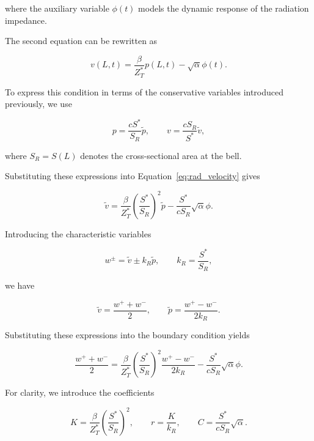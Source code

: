 \documentclass[11pt,a4paper]{report}
\theoremstyle{plain}
\theoremstyle{definition}
\begin{document}
where the auxiliary variable $\phi(t)$ models the dynamic response of the
radiation impedance.

The second equation can be rewritten as

\begin{equation}
v(L,t)
=
\dfrac{\beta}{Z_T^\ast}p(L,t)
-
\sqrt{\alpha}\phi(t).
\label{eq:rad_velocity}
\end{equation}

To express this condition in terms of the conservative variables introduced
previously, we use

\begin{equation}
p
=
\dfrac{cS^\ast}{S_R}\tilde p,
\qquad
v
=
\dfrac{cS_R}{S^\ast}\tilde v,
\end{equation}

where $S_R=S(L)$ denotes the cross-sectional area at the bell.

Substituting these expressions into
Equation~\eqref{eq:rad_velocity} gives

\begin{equation}
\tilde v
=
\dfrac{\beta}{Z_T^\ast}
\left(
\dfrac{S^\ast}{S_R}
\right)^2
\tilde p
-
\dfrac{S^\ast}{cS_R}
\sqrt{\alpha}\phi.
\end{equation}

Introducing the characteristic variables

\begin{equation}
w^\pm
=
\tilde v
\pm
k_R\tilde p,
\qquad
k_R
=
\dfrac{S^\ast}{S_R},
\end{equation}

we have

\begin{equation}
\tilde v
=
\dfrac{w^++w^-}{2},
\qquad
\tilde p
=
\dfrac{w^+-w^-}{2k_R}.
\end{equation}

Substituting these expressions into the boundary condition yields

\begin{equation}
\dfrac{w^++w^-}{2}
=
\dfrac{\beta}{Z_T^\ast}
\left(
\dfrac{S^\ast}{S_R}
\right)^2
\dfrac{w^+-w^-}{2k_R}
-
\dfrac{S^\ast}{cS_R}
\sqrt{\alpha}\phi.
\end{equation}

For clarity, we introduce the coefficients

\begin{equation}
K
=
\dfrac{\beta}{Z_T^\ast}
\left(
\dfrac{S^\ast}{S_R}
\right)^2,
\qquad
r=\dfrac{K}{k_R},
\qquad
C
=
\dfrac{S^\ast}{cS_R}\sqrt{\alpha}.
\end{equation}
\end{document}
